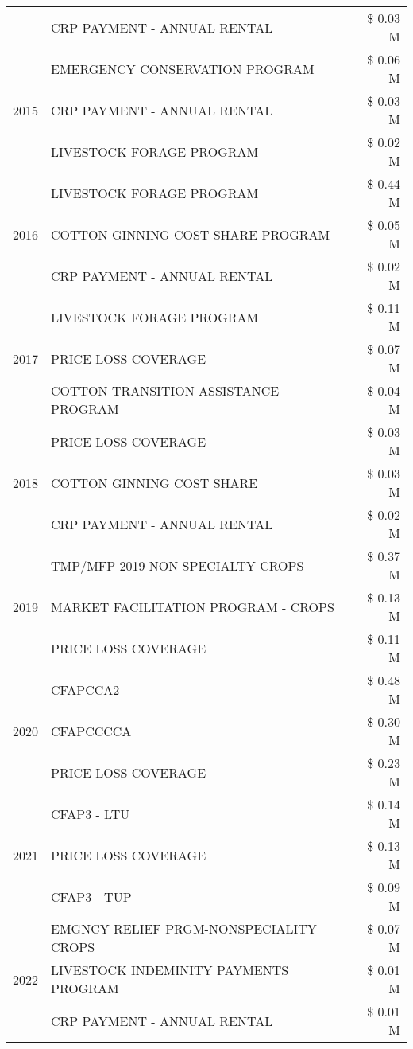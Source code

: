 \begin{tabular}{llr}
 & CRP PAYMENT - ANNUAL RENTAL & \$ 0.03 M \\
\cline{1-3}
\multirow[t]{3}{*}{2015} & EMERGENCY CONSERVATION PROGRAM & \$ 0.06 M \\
 & CRP PAYMENT - ANNUAL RENTAL & \$ 0.03 M \\
 & LIVESTOCK FORAGE PROGRAM & \$ 0.02 M \\
\cline{1-3}
\multirow[t]{3}{*}{2016} & LIVESTOCK FORAGE PROGRAM & \$ 0.44 M \\
 & COTTON GINNING COST SHARE PROGRAM & \$ 0.05 M \\
 & CRP PAYMENT - ANNUAL RENTAL & \$ 0.02 M \\
\cline{1-3}
\multirow[t]{3}{*}{2017} & LIVESTOCK FORAGE PROGRAM & \$ 0.11 M \\
 & PRICE LOSS COVERAGE & \$ 0.07 M \\
 & COTTON TRANSITION ASSISTANCE PROGRAM & \$ 0.04 M \\
\cline{1-3}
\multirow[t]{3}{*}{2018} & PRICE LOSS COVERAGE & \$ 0.03 M \\
 & COTTON GINNING COST SHARE & \$ 0.03 M \\
 & CRP PAYMENT - ANNUAL RENTAL & \$ 0.02 M \\
\cline{1-3}
\multirow[t]{3}{*}{2019} & TMP/MFP 2019 NON SPECIALTY CROPS & \$ 0.37 M \\
 & MARKET FACILITATION PROGRAM - CROPS & \$ 0.13 M \\
 & PRICE LOSS COVERAGE & \$ 0.11 M \\
\cline{1-3}
\multirow[t]{3}{*}{2020} & CFAPCCA2 & \$ 0.48 M \\
 & CFAPCCCCA & \$ 0.30 M \\
 & PRICE LOSS COVERAGE & \$ 0.23 M \\
\cline{1-3}
\multirow[t]{3}{*}{2021} & CFAP3 - LTU & \$ 0.14 M \\
 & PRICE LOSS COVERAGE & \$ 0.13 M \\
 & CFAP3 - TUP & \$ 0.09 M \\
\cline{1-3}
\multirow[t]{3}{*}{2022} & EMGNCY RELIEF PRGM-NONSPECIALITY CROPS & \$ 0.07 M \\
 & LIVESTOCK INDEMINITY PAYMENTS PROGRAM & \$ 0.01 M \\
 & CRP PAYMENT - ANNUAL RENTAL & \$ 0.01 M \\
\cline{1-3}
\bottomrule
\end{tabular}
